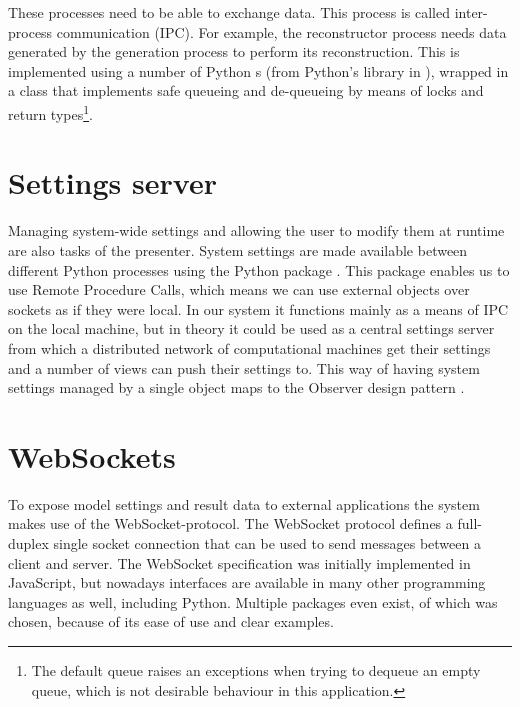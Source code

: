 \documentclass[a4paper, openany, oneside]{memoir}
\begin{document}
These processes need to be able to exchange data. This process is called inter-process communication (IPC). For example, the reconstructor process needs data generated by the generation process to perform its reconstruction. This is implemented using a number of Python s (from Python's  library in \cite{pythonref}), wrapped in a class that implements safe queueing and de-queueing by means of locks and  return types\footnote{The default queue raises an exceptions when trying to dequeue an empty queue, which is not desirable behaviour in this application.}.

\section{Settings server}
\label{sec:settings_server}
Managing system-wide settings and allowing the user to modify them at runtime are also tasks of the presenter. System settings are made available between different Python processes using the Python package . This package enables us to use Remote Procedure Calls, which means we can use external objects over sockets as if they were local. In our system it functions mainly as a means of IPC on the local machine, but in theory it could be used as a central settings server from which a distributed network of computational machines get their settings and a number of views can push their settings to. This way of having system settings managed by a single object maps to the Observer design pattern \cite{msdn-observer}.

\section{WebSockets}
\label{sec:websockets}
To expose model settings and result data to external applications the system makes use of the WebSocket-protocol. The WebSocket protocol defines a full-duplex single socket connection that can be used to send messages between a client and server. The WebSocket specification was initially implemented in JavaScript, but nowadays interfaces are available in many other programming languages as well, including Python. Multiple packages even exist, of which  was chosen, because of its ease of use and clear examples.
\end{document}
